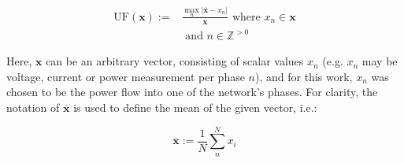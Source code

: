 \begin{equation}
\begin{split}	
	\text{UF}(\textbf{x}) :=& \frac{\max_n |\overline{\textbf{x}} - x_n|}{\overline{\textbf{x}}} \text{ where } x_n \in \textbf{x} \\
	&\text{ and } n \in \mathbb{Z}^{>0}
\end{split}
\label{ch1:equ:unbalance-equation}
\end{equation}

Here, $\textbf{x}$ can be an arbitrary vector, consisting of scalar values $x_n$ (e.g. $x_n$ may be voltage, current or power measurement per phase $n$), and for this work, $x_n$ was chosen to be the power flow into one of the network's phases.
For clarity, the notation of $\overline{\textbf{x}}$ is used to define the mean of the given vector, i.e.:

\begin{equation}
	\overline{\textbf{x}} := \frac{1}{N}\sum_n^N{x_i}
\end{equation}